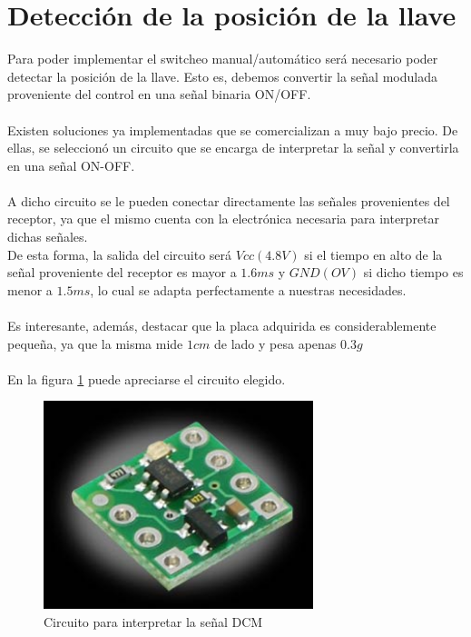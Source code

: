 \documentclass[main]{subfiles}
\begin{document}
\section{Detección de la posición de la llave}

Para poder implementar el switcheo manual/automático será necesario poder detectar la posición de la llave. Esto es, debemos convertir la señal modulada proveniente del control en una señal binaria ON/OFF.\\
\\
Existen soluciones ya implementadas que se comercializan a muy bajo precio. De ellas, se seleccionó un circuito que se encarga de interpretar la señal y convertirla en una señal ON-OFF.\\
\\
A dicho circuito se le pueden conectar directamente las señales provenientes del receptor, ya que el mismo cuenta con la electrónica necesaria para interpretar dichas señales.\\
De esta forma, la salida del circuito será $Vcc(4.8V)$ si el tiempo en alto de la señal proveniente del receptor es mayor a $1.6ms$ y $GND (OV)$ si dicho tiempo es menor a $1.5ms$, lo cual se adapta perfectamente a nuestras necesidades.\\
\\
Es interesante, además, destacar que la placa adquirida es considerablemente pequeña, ya que la misma mide $1cm$ de lado y pesa apenas $0.3g$\\
\\
En la figura \ref{fig:circuito} puede apreciarse el circuito elegido.

\begin{figure}[H]
\begin{center}
\includegraphics[width=0.7\textwidth]{./pics_switcheo/placa.jpg}
\caption{Circuito para interpretar la señal DCM}
\label{fig:circuito}
\end{center}
\end{figure}
\end{document}
